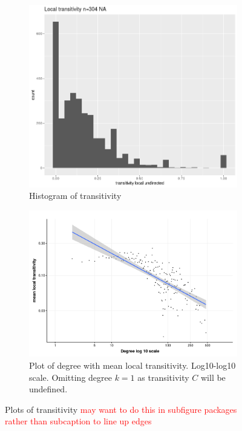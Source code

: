     
\begin{figure}
    \centering
    \begin{subfigure}[t]{0.45\textwidth}
        \centering
        \includegraphics[width=\linewidth]{images/Rplot_transitivity.png} 
        \caption{Histogram of transitivity} \label{fig:transitivity}
    \end{subfigure}
    \hfill
    \begin{subfigure}[t]{0.45\textwidth}
        \centering
        \includegraphics[width=\linewidth]{images/chapter3/ggplot2/c(k)/Rplot_C_k_new_formatted.png}
        \caption{Plot of degree with mean local transitivity. Log10-log10 scale. Omitting degree $k=1$ as transitivity $C$ will be undefined.} \label{fig:log_transitivity_degree}
    \end{subfigure}
    \caption{Plots of transitivity \textcolor{red}{may want to do this in subfigure packages rather than subcaption to line up edges}}
\end{figure}


